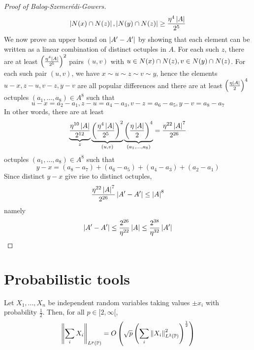 \documentclass{article}
\begin{document}
\begin{proof}[Proof of Balog-Szemerédi-Gowers]
  $$\left\lvert N(x) \cap N(z)\right\rvert, \left\lvert N(y) \cap N(z)\right\rvert \ge \frac{\eta^4\left\lvert A\right\rvert}{2^5}$$
  We now prove an upper bound on $\left\lvert A' - A'\right\rvert$ by showing that each element can be written as a linear combination of distinct octuples in $A$. For each such $z$, there are at least $\left(\frac{\eta^4\left\lvert A\right\rvert}{2^5}\right)^2$ pairs $(u, v)$ with $u \in N(x) \cap N(z), v \in N(y) \cap N(z)$. For each such pair $(u, v)$, we have $x \sim u \sim z \sim v \sim y$, hence the elements $u - x, z - u, v - z, y - v$ are all popular differences and there are at least $\left(\frac{\eta\left\lvert A\right\rvert}2\right)^4$ octuples $(a_1, \dots, a_8) \in A^8$ such that
  $$u - x = a_2 - a_1, z - u = a_4 - a_3, v - z = a_6 - a_5, y - v = a_8 - a_7$$
  In other words, there are at least
  $$\underbrace{\frac{\eta^{10}\left\lvert A\right\rvert}{2^{12}}}_z
    \underbrace{\left(\frac{\eta^4\left\lvert A\right\rvert}{2^5}\right)^2}_{(u, v)}
    \underbrace{\left(\frac{\eta\left\lvert A\right\rvert}2\right)^4}_{(a_1, \dots, a_8)} = \frac{\eta^{22}\left\lvert A\right\rvert^7}{2^{26}}$$
  octuples $(a_1, \dots, a_8) \in A^8$ such that
  $$y - x = (a_8 - a_7) + (a_6 - a_5) + (a_4 - a_3) + (a_2 - a_1)$$
  Since distinct $y - x$ give rise to distinct octuples,
  $$\frac{\eta^{22}\left\lvert A\right\rvert^7}{2^{26}} \left\lvert A' - A'\right\rvert \le \left\lvert A\right\rvert^8$$
  namely
  $$\left\lvert A' - A'\right\rvert \le \frac{2^{26}}{\eta^{22}}\left\lvert A\right\rvert \le \frac{2^{38}}{\eta^{32}}\left\lvert A'\right\rvert$$
\end{proof}

\clearpage
\section{Probabilistic tools}

\begin{nprop}
  Let $X_1, \dots, X_n$ be independent random variables taking values $\pm x_i$ with probability $\frac 12$. Then, for all $p \in [2, \infty[$,
  $$\left\lVert \sum_i X_i\right\rVert_{L^p(\mathbb P)} = O\left(\sqrt p\left(\sum_i \left\lVert X_i\right\rVert_{L^2(\mathbb P)}^2\right)^{\frac 12}\right)$$
\end{nprop}

\newlec
\end{document}
